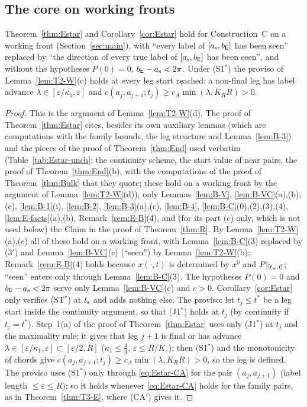 \subsection{The core on working fronts}

\begin{lemma}\label{lem:T3-W}
Theorem~\ref{thm:Estar} and Corollary~\ref{cor:Estar} hold for Construction~C on a working front (Section~\ref{sec:main}), with
``every label of $[a_{\mathrm s},b_{\mathsf E}]$ has been seen'' replaced by ``the direction of every true label of $[a_{\mathrm s},b_{\mathsf E}]$ has
been seen'', and without the hypotheses $P(0)=0$, $b_{\mathsf E}-a_{\mathrm s}<2\pi$. Under \textup{(S1$^*$)} the proviso of
Lemma~\ref{lem:T2-W}(c) holds at every leg start reached: a non-final leg has label advance $\lambda\in[\varepsilon/\kappa_1,\varepsilon]$
and $c(a_j,a_{j+1};t_j)\ge c_A\min(\lambda,K_RR)>0$.
\end{lemma}
\begin{proof}
This is the argument of Lemma~\ref{lem:T2-W}(d). The proof of Theorem~\ref{thm:Estar} cites, besides its own auxiliary lemmas
(which are computations with the family bounds, the leg structure and Lemma~\ref{lem:B-3}) and the pieces of the proof of
Theorem~\ref{thm:End} used verbatim (Table~\ref{tab:Estar-unch}: the continuity scheme, the start value of near pairs, the proof of
Theorem~\ref{thm:End}(b), with the computations of the proof of Theorem~\ref{thm:Bulk} that they quote; these hold on a working
front by the argument of Lemma~\ref{lem:T2-W}(d)), only Lemmas~\ref{lem:B-V},
\ref{lem:B-VC}(a),(b),(c), \ref{lem:B-1}(i), \ref{lem:B-2}, \ref{lem:B-3}(a),(c), \ref{lem:B-4}, \ref{lem:B-C}(0),(2),(3),(4),
\ref{lem:E-facts}(a),(b), Remark~\ref{rem:E-B}(4), and (for its part (c) only, which is not used below) the Claim in the proof of
Theorem~\ref{thm:R}. By Lemma~\ref{lem:T2-W}(a),(c) all of these hold on a working front, with Lemma~\ref{lem:B-C}(3) replaced by
\textup{($3'$)} and Lemma~\ref{lem:B-VC}(c) (``seen'') by Lemma~\ref{lem:T2-W}(b); Remark~\ref{rem:E-B}(4) holds because
$x(\cdot,t)$ is determined by $x^0$ and $P|_{[t_{\mathrm w},t]}$; ``seen'' enters only through
Lemma~\ref{lem:B-C}(3). The hypotheses $P(0)=0$ and $b_{\mathsf E}-a_{\mathrm s}<2\pi$ serve only Lemma~\ref{lem:B-VC}(c) and $c>0$.
Corollary~\ref{cor:Estar} only verifies (ST$^*$) at $t_{\mathrm s}$ and adds nothing else. The proviso: let $t_j\le t^*$ be a leg start inside
the continuity argument, so that (J1$^*$) holds at $t_j$ (by continuity if $t_j=t^*$). Step~1(a) of the proof of Theorem~\ref{thm:Estar} uses only (J1$^*$) at
$t_j$ and the maximality rule; it gives that leg $j+1$ is final or has advance $\lambda\in[\varepsilon/\kappa_1,\varepsilon]\subset
[\varepsilon/2,R]$ ($\kappa_1\le\frac43$, $\varepsilon\le R/K_\varepsilon$); then (S1$^*$) and the monotonicity of chords give
$c(a_j,a_{j+1};t_j)\ge c_A\min(\lambda,K_RR)>0$, so the leg is defined. The proviso uses (S1$^*$) only through
\eqref{eq:Estar-CA} for the pair $(a_j,a_{j+1})$ (label length $\le\varepsilon\le R$); so it holds whenever \eqref{eq:Estar-CA}
holds for the family pairs, as in Theorem~\ref{thm:T3-E}, where (CA$'$) gives it.
\end{proof}

